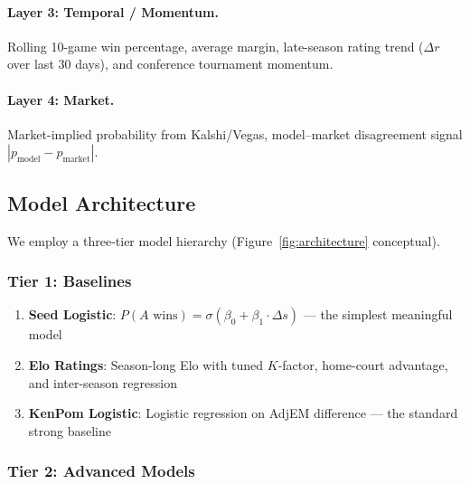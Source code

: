 \documentclass[11pt,a4paper]{article}
\begin{document}
\paragraph{Layer 3: Temporal / Momentum.}
Rolling 10-game win percentage, average margin, late-season rating trend ($\Delta r$ over last 30 days), and conference tournament momentum.

\paragraph{Layer 4: Market.}
Market-implied probability from Kalshi/Vegas, model--market disagreement signal $|p_{\text{model}} - p_{\text{market}}|$.

\subsection{Model Architecture}

We employ a three-tier model hierarchy (Figure~\ref{fig:architecture} conceptual).

\subsubsection{Tier 1: Baselines}

\begin{enumerate}[nosep]
    \item \textbf{Seed Logistic}: $P(A \text{ wins}) = \sigma(\beta_0 + \beta_1 \cdot \Delta s)$ --- the simplest meaningful model
    \item \textbf{Elo Ratings}: Season-long Elo with tuned $K$-factor, home-court advantage, and inter-season regression
    \item \textbf{KenPom Logistic}: Logistic regression on AdjEM difference --- the standard strong baseline
\end{enumerate}

\subsubsection{Tier 2: Advanced Models}
\end{document}
